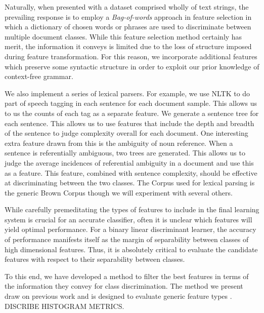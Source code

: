 
Naturally, when presented with a dataset comprised wholly of text strings, the prevailing response is to employ a \emph{Bag-of-words} approach in feature selection in which a dictionary of chosen words or phrases are used to discriminate between multiple document classes. While this feature selection method certainly has merit, the information it conveys is limited due to the loss of structure imposed during feature transformation. For this reason, we incorporate additional features which preserve some syntactic structure in order to exploit our prior knowledge of context-free grammar.

We also implement a series of lexical parsers.  For example, we use NLTK to do part of speech tagging in each sentence for each document sample.  This allows us to us the counts of each tag as a separate feature.  We generate a sentence tree for each sentence.  This allows us to use features that include the depth and breadth of the sentence to judge complexity overall for each document.  One interesting extra feature drawn from this is the ambiguity of noun reference.  When a sentence is referentially ambiguous, two trees are generated.  This allows us to judge the average incidences of referential ambiguity in a document and use this as a feature.  This feature, combined with sentence complexity, should be effective at discriminating between the two classes.  The Corpus used for lexical parsing is the generic Brown Corpus though we will experiment with several others.

While carefully premeditating the types of features to include in the final learning system is crucial for an accurate classifier, often it is unclear which features will yield optimal performance. For a binary linear discriminant learner, the accuracy of performance manifests itself as the margin of separability between classes of high dimensional features. Thus, it is absolutely critical to evaluate the candidate features with respect to their separability between classes.

To this end, we have developed a method to filter the best features in terms of the information they convey for class discrimination. The method we present draw on previous work and is designed to evaluate generic feature types \cite{french}.
DISCRIBE HISTOGRAM METRICS.